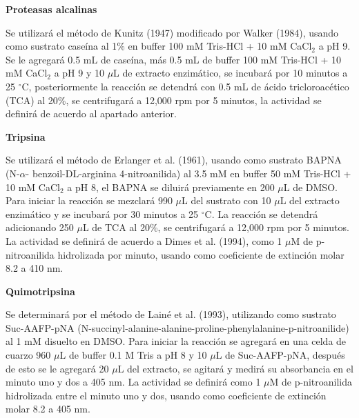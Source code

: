 \documentclass[12pt,a4paper]{article}
\begin{document}
\begin{multicols}{2}
\begin{Exercice}
\end{Exercice}

\begin{Exercice} \textbf{Proteasas alcalinas}
	
	Se utilizar\'a el método de Kunitz (1947) modificado por Walker (1984), usando como sustrato caseína al 1\% en buffer 100 mM Tris-HCl + 10 mM CaCl$_2$ a pH 9. Se le agregar\'a 0.5 mL de caseína, más 0.5 mL de buffer 100 mM Tris-HCl + 10 mM CaCl$_2$ a pH 9 y 10 $\mu$L de extracto enzimático, se incubar\'a por 10 minutos a 25 $^\circ$C, posteriormente la reacción se detendr\'a con 0.5 mL de \'acido tricloroacético (TCA) al 20\%, se centrifugar\'a a 12,000 rpm por 5 minutos, la actividad se definir\'a de acuerdo al apartado anterior.

\end{Exercice}

\begin{Exercice}\textbf{Tripsina}
	
	Se utilizar\'a el método de Erlanger et al. (1961), usando como sustrato BAPNA (N-$\alpha$- benzoil-DL-arginina 4-nitroanilida) al 3.5 mM en buffer 50 mM Tris-HCl + 10 mM CaCl$_2$ a pH 8, el BAPNA se diluir\'a previamente en 200 $\mu$L de DMSO. Para iniciar la reacción se mezclar\'a 990 $\mu$L del sustrato con 10 $\mu$L del extracto enzimático y se incubar\'a por 30 minutos a 25 $^\circ$C. La reacción se detendr\'a adicionando 250 $\mu$L de TCA al 20\%, se centrifugar\'a a 12,000 rpm por 5 minutos. La actividad se definir\'a de acuerdo a Dimes et al. (1994), como 1 $\mu$M de p-nitroanilida hidrolizada por minuto, usando como coeficiente de extinción molar 8.2 a 410 nm.
	
\end{Exercice}

\begin{Exercice} \textbf{Quimotripsina}
	
	Se determinar\'a por el método de Lainé et al. (1993), utilizando como sustrato Suc-AAFP-pNA (N-succinyl-alanine-alanine-proline-phenylalanine-p-nitroanilide) al 1 mM disuelto en DMSO. Para iniciar la reacción se agregar\'a en una celda de cuarzo 960 $\mu$L de buffer 0.1 M Tris a pH 8 y 10 $\mu$L de Suc-AAFP-pNA, despu\'es de esto se le agregar\'a 20 $\mu$L del extracto, se agitar\'a y medir\'a su absorbancia en el minuto uno y dos a 405 nm. La actividad se definir\'a como 1 $\mu$M de p-nitroanilida hidrolizada entre el minuto uno y dos, usando como coeficiente de extinción molar 8.2 a 405 nm.
	
\end{Exercice}


\end{multicols}
\end{document}
